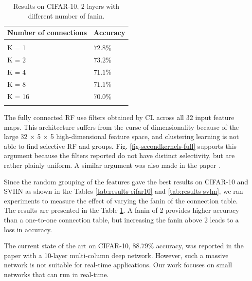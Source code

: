 \documentclass{article} %
\begin{document}
\setlength{\tabcolsep}{10pt}

\begin{table}
\vspace*{-15pt}
\caption{Results on CIFAR-10, 2 layers with different number of fanin.}
\vspace*{-5pt}
\begin{centering}
\begin{tabular}{ll}
\multicolumn{1}{c}{\bf Number of connections}  &\multicolumn{1}{c}{\bf Accuracy}\\
\hline \hline \\
K = 1		&$72.8\%$\\
K = 2		&$73.2\%$\\
K = 4		&$71.1\%$\\
K = 8		&$71.1\%$\\
K = 16		&$70.0\%$
\\ \hline \hline 
\label{tab:fanin}
\end{tabular}
\vspace*{-25pt}
\end{centering}
\end{table}

The fully connected RF use filters obtained by CL across all 32 input feature maps. This architecture suffers from the curse of dimensionality because of the large 32 $\times$ 5 $\times$ 5 high-dimensional feature space, and clustering learning is not able to find selective RF and groups.
Fig. \ref{fig-secondkernels-full} supports this argument because the filters reported do not have distinct selectivity, but are rather plainly uniform. A similar argument was also made in the paper \cite{coates2012learning}.

Since the random grouping of the features gave the best results on CIFAR-10 and SVHN as shown in the Tables \ref{tab:results-cifar10} and \ref{tab:results-svhn}, we ran experiments to measure the effect of varying the fanin of the connection table.
The results are presented in the Table \ref{tab:fanin}. A fanin of 2 provides higher accuracy than a one-to-one connection table, but increasing the fanin above 2 leads to a loss in accuracy.

The current state of the art on CIFAR-10, 88.79\% accuracy, was reported in the paper \cite{dan2012multicolnet} with a 10-layer multi-column deep network. However,
such a massive network is not suitable for real-time applications. Our work focuses on small networks that can run in real-time.
\end{document}
